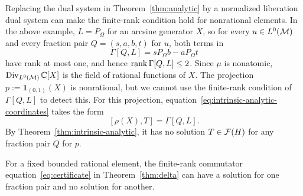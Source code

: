 Replacing the dual system in Theorem~\ref{thm:analytic} by a normalized liberation dual system can make the finite-rank condition hold for nonrational elements.
In the above example, $L=P_\Omega$ for an arcsine generator $X$, so for every $u\in L^0(\mathcal M)$ and every fraction pair $Q=(s,a,b,t)$ for $u$, both terms in
\[
 \Gamma[Q,L]=sP_\Omega b-aP_\Omega t
\]
have rank at most one, and hence $\operatorname{rank}\Gamma[Q,L]\leq 2$.
Since $\mu$ is nonatomic, $\operatorname{Div}_{L^0(\mathcal M)}\mathbb C[X]$ is the field of rational functions of $X$.
The projection $p:=\mathbf 1_{(0,1)}(X)$ is nonrational, but we cannot use the finite-rank condition of $\Gamma[Q,L]$ to detect this.
For this projection, equation~\eqref{eq:intrinsic-analytic-coordinates} takes the form
\[
 [\rho(X),T]=\Gamma[Q,L].
\]
By Theorem~\ref{thm:intrinsic-analytic}, it has no solution $T\in\mathcal F(H)$ for any fraction pair $Q$ for $p$.

For a fixed bounded rational element, the finite-rank commutator equation~\eqref{eq:certificate} in Theorem~\ref{thm:delta} can have a solution for one fraction pair and no solution for another.

